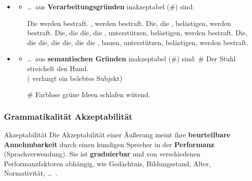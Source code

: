 \begin{frame}

\begin{itemize}
	\item[]
	
	\begin{itemize}
	\item \dots\ aus \textbf{Verarbeitungsgründen} inakzeptabel (\#) sind:
		
\pause
		\ex Die werden bestraft.
		\ex {}, werden bestraft.
		\ex Die, die , belästigen, werden bestraft.
		\ex Die, die die, die , unterstützen, belästigen, werden bestraft.
		\ex Die, die die, die die, die die , bauen, unterstützen, belästigen, werden bestraft.
		\z
\end{itemize}

\end{itemize}
\nocite{Fries15a, Repp&Co15a}
\end{frame}


\begin{frame}

\begin{itemize}
	\item[]
	
	\begin{itemize}
		
		\item \dots\ aus \textbf{semantischen Gründen} inakzeptabel (\#) sind:
		\ea \# Der Stuhl streichelt den Hund.\\
		( verlangt ein belebtes Subjekt)
		\z
		
		\ea \# Farblose grüne Ideen schlafen wütend. \hfill 
		\citep{Chomsky57x}
		\z
		
	\end{itemize}

\end{itemize}
\nocite{Coseriu88a, Fries15a, Repp&Co15a}
\end{frame}


\begin{frame}
\frametitle{Grammatikalität \vs Akzeptabilität}

\begin{block}{Akzeptabilität}
Die Akzeptabilität einer Äußerung meint ihre \textbf{beurteilbare Annehmbarkeit} durch einen kundigen Sprecher in der \textbf{Performanz} (Sprachverwendung). Sie ist \textbf{graduierbar} und von verschiedenen Performanzfaktoren abhängig, wie \zB Gedächtnis, Bildungsstand, Alter, Normativität, \dots\ \citep[vgl.][]{Fries&MyP16b}.

\end{block}

\end{frame}


